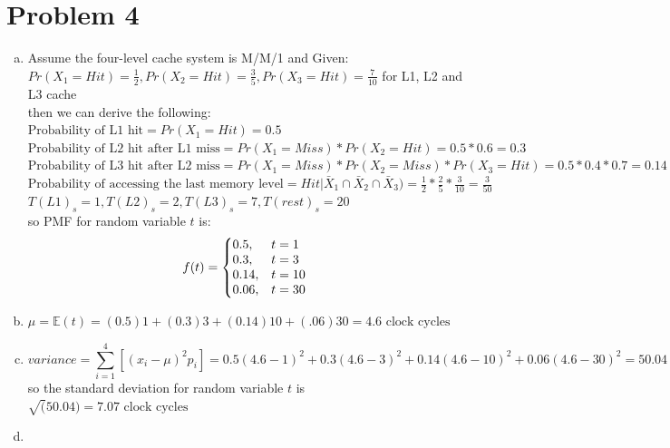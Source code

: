 \documentclass{article}   	                         %
\begin{document}
\section*{Problem 4}
\begin{enumerate}[(a)]
\item
Assume the four-level cache system is M/M/1 and 
Given:\\
$Pr(X_{1} = Hit) = \frac{1}{2}, Pr(X_{2} = Hit) = \frac{3}{5}, Pr(X_{3} = Hit) = \frac{7}{10}$ for L1, L2 and L3 cache\\
then we can derive the following:
$\text{Probability of L1 hit} = Pr(X_{1} = Hit) = 0.5$\\
$\text{Probability of L2 hit after L1 miss} = Pr(X_{1} = Miss)*Pr(X_{2} = Hit)= 0.5*0.6 = 0.3$\\
$\text{Probability of L3 hit after L2 miss} = Pr(X_{1} = Miss)*Pr(X_{2} = Miss)*Pr(X_{3} = Hit) = 0.5*0.4*0.7 = 0.14$\\
$\text{Probability of accessing the last memory level} = Hit | \bar X_{1}\cap \bar X_{2}\cap \bar X_{3}) = \frac{1}{2}*\frac{2}{5}*\frac{3}{10} = \frac{3}{50}$\\
$T(L1)_s = 1, T(L2)_s = 2, T(L3)_s = 7, T(rest)_s = 20 $\\
so PMF for random variable $t$ is:\\
\begin{equation}
  f(t) =\left\{
  \begin{array}{@{}ll@{}ll@{}ll@{}}
    0.5, & t =1 \\
    0.3, & t = 3 \\
    0.14, & t = 10 \\
    0.06, & t = 30
  \end{array}\right.
\end{equation} 
\item
$\mu = \mathds{E}(t) = (0.5)1 + (0.3)3 + (0.14)10 + (.06)30 = 4.6 \text{   clock cycles}$
\item
$$variance = \sum_{i = 1}^4 [(x_i -\mu)^2p_i] = 0.5(4.6 - 1)^2 + 0.3(4.6 - 3)^2 + 0.14(4.6 - 10)^2 + 0.06(4.6 - 30)^2 = 50.04$$
so the standard deviation for random variable $t$ is $\sqrt(50.04) = 7.07  \text{   clock cycles}$\\
\item

\end{enumerate}
\end{document}
